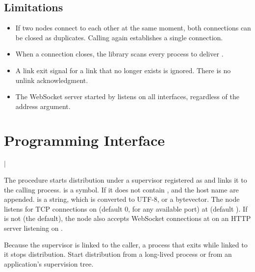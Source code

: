 \subsection {Limitations}

\begin{itemize}
\item If two nodes connect to each other at the same moment, both
  connections can be closed as duplicates. Calling 
  again establishes a single connection.
\item When a connection closes, the library scans every process to
  deliver .
\item A link exit signal for a link that no longer exists is ignored.
  There is no unlink acknowledgment.
\item The WebSocket server started by  listens on
  all interfaces, regardless of the address argument.
\end{itemize}

\section {Programming Interface}

\begin{procedure}
\end{procedure}
\returns{}
 $|$

The  procedure starts distribution under a
supervisor registered as  and links it to the calling
process.  is a symbol. If it does not contain ,
 and the host name are appended.  is a string,
which is converted to UTF-8, or a bytevector. The node listens for TCP
connections on  (default 0, for any available port) at
 (default ). If  is not
 (the default), the node also accepts WebSocket connections
at  on an HTTP server listening on .

Because the supervisor is linked to the caller, a process that exits
while linked to it stops distribution. Start distribution from a
long-lived process or from an application's supervision tree.

\begin{procedure}
\end{procedure}
\returns{} 

